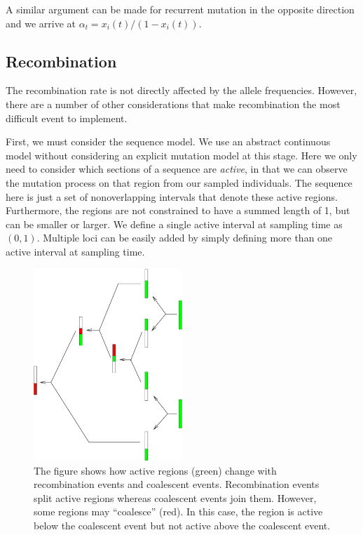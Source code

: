 \documentclass{article}
\begin{document}
A similar argument can be made for recurrent mutation in the opposite direction
and we arrive at $\alpha_t=x_i(t)/(1-x_i(t))$.

\subsection{Recombination}

The recombination rate is not directly affected by the allele frequencies.
However, there are a number of other considerations that make recombination the
most difficult event to implement.

First, we must consider the sequence model. We use an abstract continuous model
without considering an explicit mutation model at this stage. Here we only need
to consider which sections of a sequence are {\it active}, in that we can
observe the mutation process on that region from our sampled individuals. The sequence
here is just a set of nonoverlapping intervals that denote these active regions.
Furthermore, the regions are not constrained to have a summed length of 1, but
can be smaller or larger. We define a single active interval at sampling time as
$(0,1)$. Multiple loci can be easily added by simply defining more than one
active interval at sampling time.

\begin{figure}[hbtp]
\begin{center}
\includegraphics[width=0.5\textwidth,angle=-90]{recombination}
\end{center}
\caption[Recombination/Coalescent Example]{The figure shows how active regions
(green) change with recombination events and coalescent events. Recombination
events split active regions whereas coalescent events join them. However, some
regions may ``coalesce'' (red). In this case, the region is active below the
coalescent event but not active above the coalescent event.}
\label{fig:recomb}
\end{figure}
\end{document}
